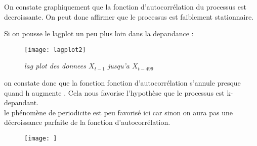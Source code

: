 On constate graphiquement que la fonction d'autocorrélation du processus est decroissante. On peut donc affirmer
que le processus est faiblement stationnaire.

Si on pousse le lagplot un peu plus loin dans la depandance :
\begin{figure}[H] 
	\begin{center} 
		\texttt{[image: lagplot2]}
	\end{center} 
	\caption{\it lag plot des donnees $X_{t-1}$ jusqu'a $X_{t-499}$} 
	\label{fig:lagplot2}
\end{figure}

on constate donc que la fonction fonction d'autocorrélation s'annule presque quand h augmente
. Cela nous favorise l'hypothèse que le processus est k-depandant. \\
le phénomène de periodicite est peu favorisé ici car sinon on aura pas une décroissance parfaite de 
la fonction d'autocorrélation.

\begin{figure}[H]
	\begin{center}
		\texttt{[image: ]}
	\end{center}
	\caption{}
	\label{fig:}
\end{figure}
